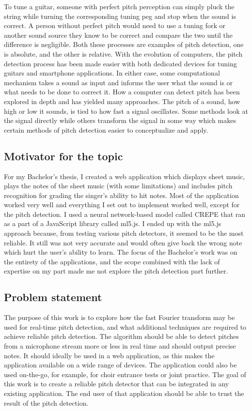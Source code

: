 To tune a guitar, someone with perfect pitch perception can simply pluck the string while turning the corresponding tuning peg and stop when the sound is correct. A person without perfect pitch would need to use a tuning fork or another sound source they know to be correct and compare the two until the difference is negligible. Both these processes are examples of pitch detection, one is absolute, and the other is relative. With the evolution of computers, the pitch detection process has been made easier with both dedicated devices for tuning guitars and smartphone applications. In either case, some computational mechanism takes a sound as input and informs the user what the sound is or what needs to be done to correct it. How a computer can detect pitch has been explored in depth and has yielded many approaches. The pitch of a sound, how high or low it sounds, is tied to how fast a signal oscillates. Some methods look at the signal directly while others transform the signal in some way which makes certain methods of pitch detection easier to conceptualize and apply.

\subsection{Motivator for the topic}
For my Bachelor's thesis, I created a web application which displays sheet music, plays the notes of the sheet music (with some limitations) and includes pitch recognition for grading the singer's ability to hit notes. Most of the application worked very well and everything I set out to implement worked well, except for the pitch detection. I used a neural network-based model called CREPE that ran as a part of a JavaScript library called ml5.js. I ended up with the ml5.js approach because, from testing various pitch detectors, it seemed to be the most reliable. It still was not very accurate and would often give back the wrong note which hurt the user's ability to learn. The focus of the Bachelor's work was on the entirety of the applications, and the scope combined with the lack of expertise on my part made me not explore the pitch detection part further.  

\subsection{Problem statement}
The purpose of this work is to explore how the fast Fourier transform may be used for real-time pitch detection, and what additional techniques are required to achieve reliable pitch detection. The algorithm should be able to detect pitches from a microphone stream more or less in real time and should output precise notes. It should ideally be used in a web application, as this makes the application available on a wide range of devices. The application could also be used on-the-go, for example, for choir entrance tests or joint practice. The goal of this work is to create a reliable pitch detector that can be integrated in any existing application. The end user of that application should be able to trust the result of the pitch detection. 
